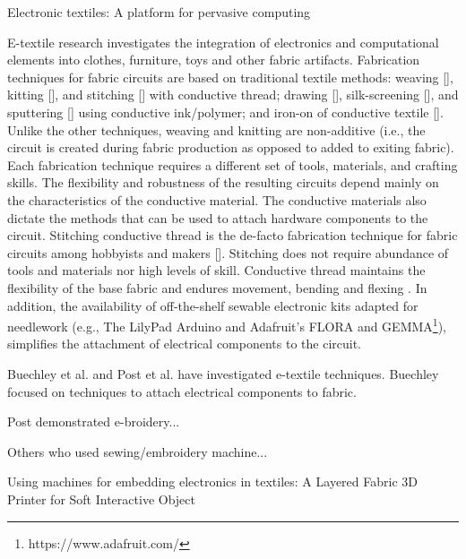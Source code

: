 Electronic textiles: A platform for pervasive computing


E-textile research investigates the integration of electronics and computational elements into clothes, furniture, toys and other fabric artifacts. 
Fabrication techniques for fabric circuits are based on traditional textile methods: weaving [], kitting [], and stitching [] with conductive thread; drawing [], silk-screening [], and sputtering [] using conductive ink/polymer; and iron-on of conductive textile []. %
Unlike the other techniques, weaving and knitting are non-additive (i.e., the circuit is created during fabric production as opposed to added to exiting fabric).  Each fabrication technique requires a different set of tools, materials, and crafting skills. The flexibility and robustness of the resulting circuits depend mainly on the characteristics of the conductive material. The conductive materials also dictate the methods that can be used to attach hardware components to the circuit. Stitching conductive thread is the de-facto fabrication technique for fabric circuits among hobbyists and makers []. Stitching does not require abundance of tools and materials nor high levels of skill. Conductive thread maintains the flexibility of the base fabric and endures movement, bending and flexing \cite{castano2014smart}. In addition, the availability of off-the-shelf sewable electronic kits adapted for needlework (e.g., The LilyPad Arduino \cite{4487082} and Adafruit's FLORA and GEMMA\footnote{https://www.adafruit.com/}),  simplifies the attachment of electrical components to the circuit.




Buechley et al. \cite{Buechley2009} and Post et al. \cite{5387040} have investigated e-textile techniques. Buechley focused on techniques to attach electrical components to fabric. 

Post demonstrated e-broidery...

Others who used sewing/embroidery machine...

Using machines for embedding electronics in textiles: A Layered Fabric 3D Printer for Soft Interactive Object

